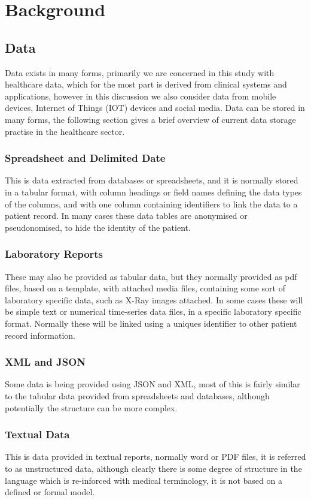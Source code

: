 \documentclass[runningheads]{llncs}
\begin{document}
	

	\section{Background}
	\subsection{Data}
	Data exists in many forms, primarily we are concerned in this study with healthcare data, which for the most part is derived from clinical systems and applications, however in this discussion we also consider data from mobile devices, Internet of Things (IOT) devices and social media. Data can be stored in many forms, the following section gives a brief overview of current data storage practise in the healthcare sector.
	\subsubsection{Spreadsheet and Delimited Date}
	This is data extracted from databases or spreadsheets, and it is normally stored in a tabular format, with column headings or field names defining the data types of the columns, and with one column containing identifiers to link the data to a patient record. In many cases these data tables are anonymised or pseudonomised, to hide the identity of the patient.
	\subsubsection{Laboratory Reports}
	These may also be provided as tabular data, but they normally provided as pdf files, based on a template, with attached media files, containing some sort of laboratory specific data, such as X-Ray images attached. In some cases these will be simple text or numerical time-series data files, in a specific laboratory specific format. Normally these will be linked using a uniques identifier to other patient record information.
	\subsubsection{XML and JSON}
	Some data is being provided using JSON and XML, most of this is fairly similar to the tabular data provided from spreadsheets and databases, although potentially the structure can be more complex.
	\subsubsection{Textual Data}
	This is data provided in textual reports, normally word or PDF files, it is referred to as unstructured data, although clearly there is some degree of structure in the language which is re-inforced with medical terminology, it is not based on a defined or formal model.
\end{document}
